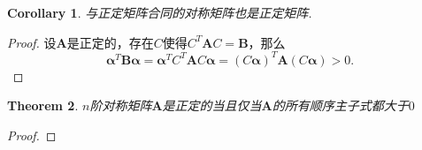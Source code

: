 \documentclass{article}
\newtheorem{theorem}{Theorem}[section]
\newtheorem{corollary}[theorem]{Corollary}
\newcommand{\mbf}[1]{\bm{#1}}
\begin{document}
\begin{corollary}
\rm 与正定矩阵合同的对称矩阵也是正定矩阵.
\end{corollary}

\begin{proof}
\rm 设$\mbf{A}$是正定的，存在$C$使得$C^T\mbf{A}C =\mbf{B}$，那么
$$
\mbf{\alpha}^T\mbf{B}\mbf{\alpha} = \mbf{\alpha}^TC^T\mbf{A}C\mbf{\alpha} = (C\mbf{\alpha})^T \mbf{A} (C\mbf{\alpha}) > 0.
$$
\end{proof}

\begin{theorem}
\rm $n$阶对称矩阵$\mbf{A}$是正定的当且仅当$\mbf{A}$的所有顺序主子式都大于$0$
\end{theorem}

\begin{proof}

\end{proof}
\end{document}
